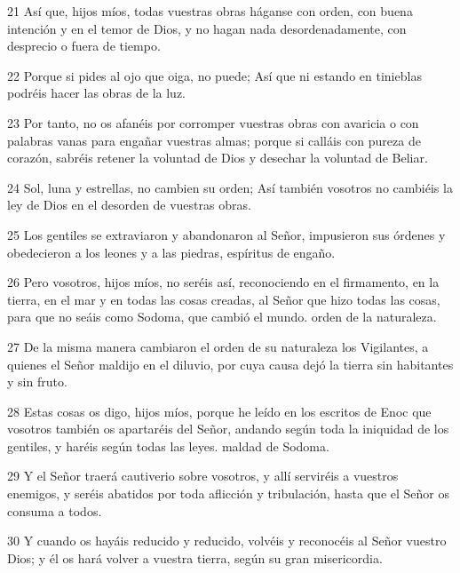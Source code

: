 \par 21 Así que, hijos míos, todas vuestras obras háganse con orden, con buena intención y en el temor de Dios, y no hagan nada desordenadamente, con desprecio o fuera de tiempo.

\par 22 Porque si pides al ojo que oiga, no puede; Así que ni estando en tinieblas podréis hacer las obras de la luz.

\par 23 Por tanto, no os afanéis por corromper vuestras obras con avaricia o con palabras vanas para engañar vuestras almas; porque si calláis con pureza de corazón, sabréis retener la voluntad de Dios y desechar la voluntad de Beliar.

\par 24 Sol, luna y estrellas, no cambien su orden; Así también vosotros no cambiéis la ley de Dios en el desorden de vuestras obras.

\par 25 Los gentiles se extraviaron y abandonaron al Señor, impusieron sus órdenes y obedecieron a los leones y a las piedras, espíritus de engaño.

\par 26 Pero vosotros, hijos míos, no seréis así, reconociendo en el firmamento, en la tierra, en el mar y en todas las cosas creadas, al Señor que hizo todas las cosas, para que no seáis como Sodoma, que cambió el mundo. orden de la naturaleza.

\par 27 De la misma manera cambiaron el orden de su naturaleza los Vigilantes, a quienes el Señor maldijo en el diluvio, por cuya causa dejó la tierra sin habitantes y sin fruto.

\par 28 Estas cosas os digo, hijos míos, porque he leído en los escritos de Enoc que vosotros también os apartaréis del Señor, andando según toda la iniquidad de los gentiles, y haréis según todas las leyes. maldad de Sodoma.

\par 29 Y el Señor traerá cautiverio sobre vosotros, y allí serviréis a vuestros enemigos, y seréis abatidos por toda aflicción y tribulación, hasta que el Señor os consuma a todos.

\par 30 Y cuando os hayáis reducido y reducido, volvéis y reconocéis al Señor vuestro Dios; y él os hará volver a vuestra tierra, según su gran misericordia.

